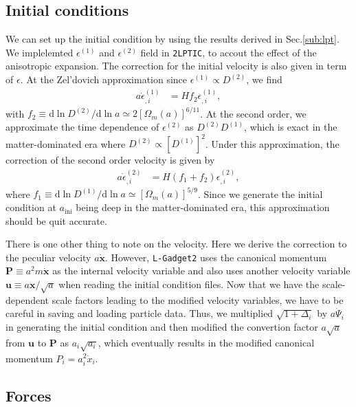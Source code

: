 \documentclass[a4paper,11pt]{article}
\renewcommand{\d}{\mathrm{d}}
\newcommand{\vx}{{\bm x}}
\newcommand{\vu}{{\bm u}}
\newcommand{\vP}{{\bm P}}
\begin{document}
\subsection{Initial conditions}
\label{sub:ics}

We can set up the initial condition by using the results derived in Sec.\ref{sub:lpt}.
We implelemted $\epsilon^{(1)}$ and $\epsilon^{(2)}$ field in \texttt{2LPTIC},
to accout the effect of the anisotropic expansion.
The correction for the initial velocity is also given in term of $\epsilon$.
At the Zel'dovich approximation since $\epsilon^{(1)}\propto D^{(2)}$, we find
\begin{align}
    a\dot\epsilon^{(1)}_{,i} &=  H f_2 \epsilon^{(1)}_{,i},
    \label{eq:vel_ZA}
\end{align}
with $f_2\equiv \d \ln D^{(2)}/\d \ln a \simeq 2[\Omega_m(a)]^{6/11}$.
At the second order, we approximate the time dependence of $\epsilon^{(2)}$ as $D^{(2)}D^{(1)}$,
which is exact in the matter-dominated era where $D^{(2)}\propto [D^{(1)}]^2$.
Under this approximation, the correction of the second order velocity is given by
\begin{align}
    a\dot\epsilon^{(2)}_{,i} &=  H (f_1 + f_2 )\epsilon^{(2)}_{,i},
    \label{eq:vel_2LPT}
\end{align}
where $f_1\equiv \d \ln D^{(1)}/\d \ln a \simeq [\Omega_m(a)]^{5/9}$.
Since we generate the initial condition at $a_\mathrm{ini}$ being deep in the matter-dominated era,
this approximation should be quit accurate.

There is one other thing to note on the velocity. Here we derive the correction to the peculiar velocity $a\dot \vx$.
However, \texttt{L-Gadget2} uses the canonical momentum $\vP \equiv a^2m\dot \vx$ as the internal velocity  variable
and also uses another velocity variable $\vu \equiv a\vx/\sqrt{a}$ when reading the initial condition files.
Now that we have the scale-dependent scale factors leading to the modified velocity variables,
we have to be careful in saving and loading particle data.
Thus, we multiplied $\sqrt{1+\Delta_i}$ by $a\dot\Psi_i$ in generating the initial condition and
then modified the convertion factor $a\sqrt{a}$ from $\vu$ to $\vP$ as $a_i\sqrt{a_i}$,
which eventually results in the modified canonical momentum $P_i=a_i^2\dot x_i$.

\subsection{Forces}
\label{sub:treepm}
\end{document}

